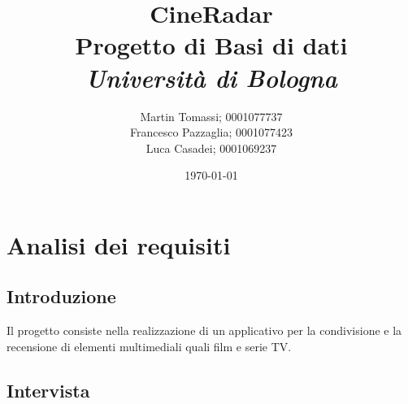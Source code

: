 \documentclass[a4paper,12pt]{report}
\title{\textbf{CineRadar}\\Progetto di Basi di dati\\\textit{Università di Bologna}}
\author{Martin Tomassi; 0001077737\\Francesco Pazzaglia; 0001077423\\Luca Casadei; 0001069237}
\date{\today}
\begin{document}
\maketitle
\tableofcontents
\chapter{Analisi dei requisiti}
\section{Introduzione}
Il progetto consiste nella realizzazione di un applicativo per la condivisione e la recensione di elementi multimediali quali film e serie TV.
\section{Intervista}
\end{document}
